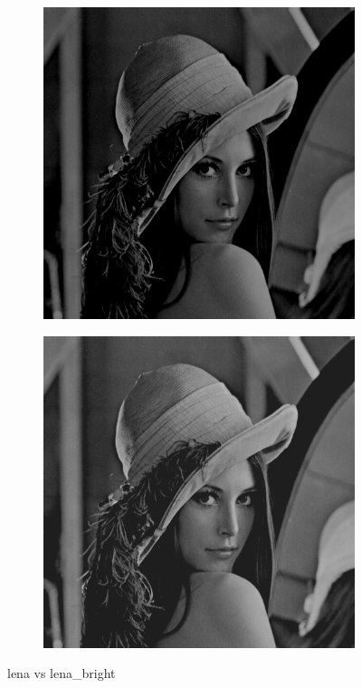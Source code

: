 \documentclass{article}
\begin{document}
\begin{multicols*}{2}
     \begin{figure}[H]
          \centering
          \begin{subfigure}{0.4\linewidth}
               \centering
               \includegraphics[width=\linewidth]{lena}
          \end{subfigure}
          \begin{subfigure}{0.4\linewidth}
               \centering
               \includegraphics[width=\linewidth]{lena_bright}
          \end{subfigure}
          \caption{lena vs lena\_bright}
     \end{figure}


\end{multicols*}
\end{document}
